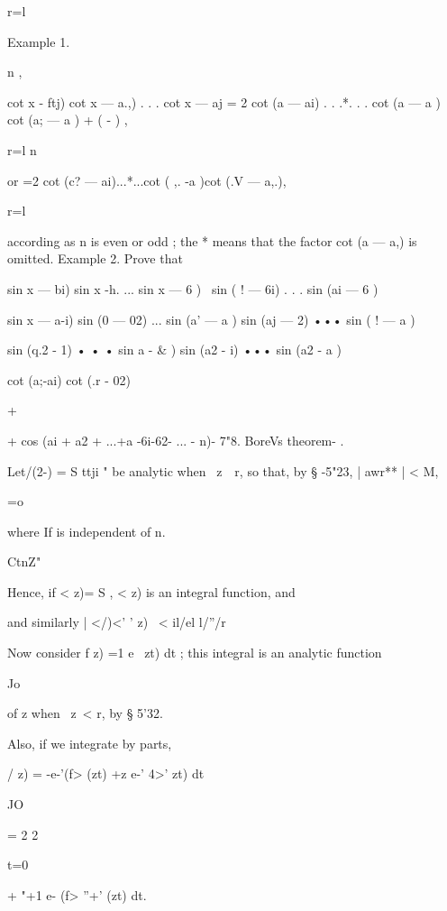 {  r=l

Example 1.

n ,

cot x - ftj) cot x — a.,) . . . cot x — aj = 2 cot (a — ai) . . .*. .
. cot (a — a ) cot (a; — a ) + ( - ) ,

r=l n

or =2 cot (c? — ai)...*...cot ( ,. -a )cot (.V — a,.),

r=l

according as n is even or odd ; the * means that the factor cot (a —
a,) is omitted. Example 2. Prove that

sin x — bi) sin x -h. ... sin x — 6 ) \ sin ( ! — 6i) . . . sin (ai —
6 )



sin x — a-i) sin (0 — 02) ... sin (a' — a ) sin (aj — 2) ••• sin ( ! —
a )

sin (q.2 - 1) • • • sin a - \& ) sin (a2 - i) ••• sin (a2 - a )



cot (a;-ai) cot (.r - 02)



+



+ cos (ai + a2 + ...+a -6i-62- ... - n)- 7"8. BoreVs theorem- .

Let/(2-) = S ttji " be analytic when \ z\ \ r, so that, by § -5"23, |
awr** | < M,

 =o

where If is independent of n.



CtnZ"



Hence, if < z)= S , < z) is an integral function, and

and similarly | </)<' ' z) \ < il/el l/''/r

Now consider f z) =1 e~ zt) dt ; this integral is an analytic function

Jo

of z when \ z\ < r, by § 5'32.

Also, if we integrate by parts,

/ z) = -e-'(f> (zt) +z e-' 4>' zt) dt

JO



= 2 2

 t=0






+ "+1 e- (f> ''+' (zt) dt.



}
